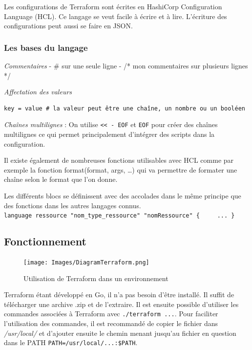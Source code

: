 \documentclass[]{article}
\begin{document}
Les configurations de Terraform sont écrites en HashiCorp Configuration
Language (HCL). Ce langage se veut facile à écrire et à lire. L'écriture
des configurations peut aussi se faire en JSON.

\subsubsection{Les bases du langage}\label{les-bases-du-langage}

\emph{Commentaires} - \# sur une seule ligne - /* mon commentaires sur
plusieurs lignes */

\emph{Affectation des valeurs}

\begin{verbatim}
key = value # la valeur peut être une chaîne, un nombre ou un booléen
\end{verbatim}

\emph{Chaînes multilignes} : On utilise
\texttt{\textless{}\textless{}\ -\ EOF} et \texttt{EOF} pour créer des
chaînes multilignes ce qui permet principalement d'intégrer des scripts
dans la configuration.

Il existe également de nombreuses fonctions utilisables avec HCL comme
par exemple la fonction format(format, args, \ldots{}) qui va permettre
de formater une chaîne selon le format que l'on donne.

Les différents blocs se définissent avec des accolades dans le même
principe que des fonctions dans les autres langages connus.
\texttt{language\ ressource\ "nom\_type\_ressource"\ "nomRessource"\ \{\ \ \ \ \ ...\ \}}

\subsection{Fonctionnement}\label{fonctionnement}

\begin{figure}
\centering
\texttt{[image: Images/DiagramTerraform.png]}
\caption{Utilisation de Terraform dans un environnement}
\end{figure}

Terraform étant développé en Go, il n'a pas besoin d'être installé. Il
suffit de télécharger une archive .zip et de l'extraire. Il est ensuite
possible d'utiliser les commandes associées à Terraform avec
\texttt{./terraform\ ...}. Pour faciliter l'utilisation des commandes,
il est recommandé de copier le fichier dans \emph{/usr/local/} et
d'ajouter ensuite le chemin menant jusqu'au fichier en question dans le
PATH \texttt{PATH=/usr/local/...:\$PATH}.
\end{document}
